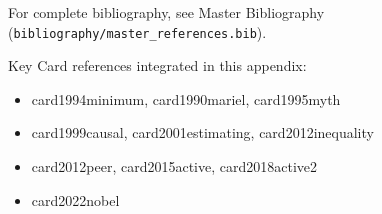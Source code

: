 \nocite{bcm_master}

For complete bibliography, see Master Bibliography (\texttt{bibliography/master\_references.bib}).

Key Card references integrated in this appendix:
\begin{itemize}[nosep]
    \item card1994minimum, card1990mariel, card1995myth
    \item card1999causal, card2001estimating, card2012inequality
    \item card2012peer, card2015active, card2018active2
    \item card2022nobel
\end{itemize}


